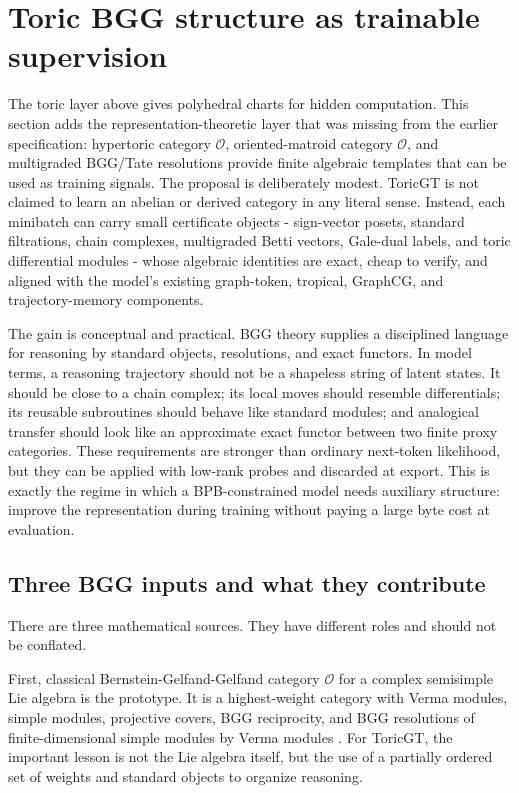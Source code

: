 \documentclass[11pt]{article}
\theoremstyle{definition}
\theoremstyle{plain}
\theoremstyle{remark}
\numberwithin{equation}{section}
\begin{document}
\section{Toric BGG structure as trainable supervision}\label{sec:toric-bgg}

The toric layer above gives polyhedral charts for hidden computation.  This section adds the representation-theoretic layer that was missing from the earlier specification: hypertoric category $\mathcal O$, oriented-matroid category $\mathcal O$, and multigraded BGG/Tate resolutions provide finite algebraic templates that can be used as training signals.  The proposal is deliberately modest.  ToricGT is not claimed to learn an abelian or derived category in any literal sense.  Instead, each minibatch can carry small certificate objects - sign-vector posets, standard filtrations, chain complexes, multigraded Betti vectors, Gale-dual labels, and toric differential modules - whose algebraic identities are exact, cheap to verify, and aligned with the model's existing graph-token, tropical, GraphCG, and trajectory-memory components.

The gain is conceptual and practical.  BGG theory supplies a disciplined language for reasoning by standard objects, resolutions, and exact functors.  In model terms, a reasoning trajectory should not be a shapeless string of latent states.  It should be close to a chain complex; its local moves should resemble differentials; its reusable subroutines should behave like standard modules; and analogical transfer should look like an approximate exact functor between two finite proxy categories.  These requirements are stronger than ordinary next-token likelihood, but they can be applied with low-rank probes and discarded at export.  This is exactly the regime in which a BPB-constrained model needs auxiliary structure: improve the representation during training without paying a large byte cost at evaluation.

\subsection{Three BGG inputs and what they contribute}

There are three mathematical sources.  They have different roles and should not be conflated.

First, classical Bernstein-Gelfand-Gelfand category $\mathcal O$ for a complex semisimple Lie algebra is the prototype.  It is a highest-weight category with Verma modules, simple modules, projective covers, BGG reciprocity, and BGG resolutions of finite-dimensional simple modules by Verma modules \cite{bgg1976category}.  For ToricGT, the important lesson is not the Lie algebra itself, but the use of a partially ordered set of weights and standard objects to organize reasoning.
\end{document}
